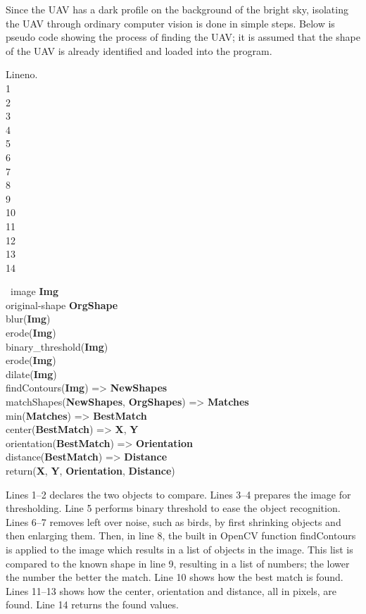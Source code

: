 Since the UAV has a dark profile on the background of the bright sky, isolating the UAV through ordinary computer vision is done in simple steps. Below is pseudo code showing the process of finding the UAV; it is assumed that the shape of the UAV is already identified and loaded into the program.

\begin{center}
	\begin{minipage}[t]{0.1\textwidth}
		\begin{flushright}
			Lineno.\\1\\2\\3\\4\\5\\6\\7\\8\\9\\10\\11\\12\\13\\14
		\end{flushright}
	\end{minipage}
	\begin{minipage}[t]{0.8\textwidth}
		~\-image \textbf{Img}\\
		original-shape \textbf{OrgShape}\\
		blur(\textbf{Img})\\
		erode(\textbf{Img})\\
		binary\_threshold(\textbf{Img})\\
		erode(\textbf{Img})\\
		dilate(\textbf{Img})\\
		findContours(\textbf{Img}) => \textbf{NewShapes}\\
		matchShapes(\textbf{NewShapes}, \textbf{OrgShapes}) => \textbf{Matches}\\
		min(\textbf{Matches}) => \textbf{BestMatch}\\
		center(\textbf{BestMatch}) => \textbf{X}, \textbf{Y}\\
		orientation(\textbf{BestMatch}) => \textbf{Orientation}\\
		distance(\textbf{BestMatch}) => \textbf{Distance}\\
		return(\textbf{X}, \textbf{Y}, \textbf{Orientation}, \textbf{Distance})
	\end{minipage}
\end{center}
Lines 1--2 declares the two objects to compare. Lines 3--4 prepares the image for thresholding. Line 5 performs binary threshold to ease the object recognition. Lines 6--7 removes left over noise, such as birds, by first shrinking objects and then enlarging them. Then, in line 8, the built in OpenCV function findContours is applied to the image which results in a list of objects in the image. This list is compared to the known shape in line 9, resulting in a list of numbers; the lower the number the better the match. Line 10 shows how the best match is found. Lines 11--13 shows how the center, orientation and distance, all in pixels, are found. Line 14 returns the found values.


